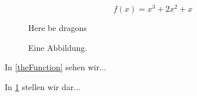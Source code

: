 \documentclass[a4paper]{amsart}
\begin{document}
\begin{equation}
    f(x) = x^3 + 2x^2 + x \tag{*}\label{theFunction}
\end{equation}

\begin{figure}
    \caption{Eine Abbildung.}
    \label{myFig}
    Here be dragons
\end{figure}

In \cref{theFunction} sehen wir...

In \cref{myFig} stellen wir dar...
\end{document}
